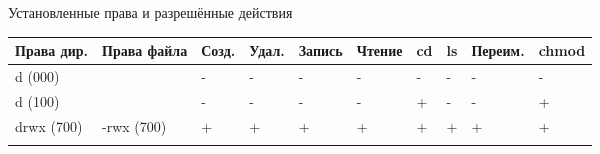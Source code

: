 \documentclass[
  ignorenonframetext,
  aspectratio=169,
  russian,
]{beamer}
\begin{document}
\begin{frame}{Установленные права и разрешённые действия}
\label{ux443ux441ux442ux430ux43dux43eux432ux43bux435ux43dux43dux44bux435-ux43fux440ux430ux432ux430-ux438-ux440ux430ux437ux440ux435ux448ux451ux43dux43dux44bux435-ux434ux435ux439ux441ux442ux432ux438ux44f}
\begin{longtable}[]{@{}
  >{\raggedright\arraybackslash}p{}
  >{\centering\arraybackslash}p{}
  >{\centering\arraybackslash}p{}
  >{\centering\arraybackslash}p{}
  >{\centering\arraybackslash}p{}
  >{\centering\arraybackslash}p{}
  >{\centering\arraybackslash}p{}
  >{\centering\arraybackslash}p{}
  >{\centering\arraybackslash}p{}
  >{\centering\arraybackslash}p{}@{}}
\toprule\noalign{}
\begin{minipage}[b]{\linewidth}\raggedright
Права дир.
\end{minipage} & \begin{minipage}[b]{\linewidth}\centering
Права файла
\end{minipage} & \begin{minipage}[b]{\linewidth}\centering
Созд.
\end{minipage} & \begin{minipage}[b]{\linewidth}\centering
Удал.
\end{minipage} & \begin{minipage}[b]{\linewidth}\centering
Запись
\end{minipage} & \begin{minipage}[b]{\linewidth}\centering
Чтение
\end{minipage} & \begin{minipage}[b]{\linewidth}\centering
cd
\end{minipage} & \begin{minipage}[b]{\linewidth}\centering
ls
\end{minipage} & \begin{minipage}[b]{\linewidth}\centering
Переим.
\end{minipage} & \begin{minipage}[b]{\linewidth}\centering
chmod
\end{minipage} \\
\midrule\noalign{}
\endhead
d (000) & 0 & - & - & - & - & - & - & - & - \\
d (100) & 0 & - & - & - & - & + & - & - & + \\
drwx (700) & -rwx (700) & + & + & + & + & + & + & + & + \\
\bottomrule\noalign{}
\end{longtable}
\end{frame}
\end{document}
